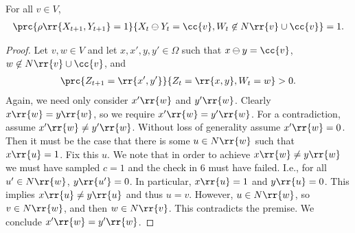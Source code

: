 \documentclass{article}
\begin{document}
\begin{claim*}[3b]
  For all $v\in V$,
  \begin{align*}
    \prc{\rho\rr{X_{t+1},Y_{t+1}}=1}{X_t\ominus Y_t=\cc{v},W_t\not\in N\rr{v}\cup\cc{v}}=1.
  \end{align*}
  \begin{proof}
    Let $v,w\in V$ and let $x,x',y,y'\in\Omega$ such that $x\ominus y=\cc{v}$, $w\not\in N\rr{v}\cup\cc{v}$, and
    \begin{align*}
      \prc{Z_{t+1}=\rr{x',y'}}{Z_t=\rr{x,y},W_t=w}>0.
    \end{align*}
    Again, we need only consider $x'\rr{w}$ and $y'\rr{w}$. Clearly $x\rr{w}=y\rr{w}$, so
    we require $x'\rr{w}=y'\rr{w}$. For a contradiction, assume $x'\rr{w}\neq y'\rr{w}$. Without loss of generality
    assume $x'\rr{w}=0$. Then it must be the case that there is some $u\in N\rr{w}$ such that
    $x\rr{u}=1$. Fix this $u$. We note that in order to achieve $x\rr{w}\neq y\rr{w}$ we must
    have sampled $c=1$ and the check in 6 must have failed. I.e., for all $u'\in N\rr{w}$,
    $y\rr{u'}=0$. In particular, $x\rr{u}=1$ and $y\rr{u}=0$. This implies $x\rr{u}\neq y\rr{u}$
    and thus $u=v$. However, $u\in N\rr{w}$, so $v\in N\rr{w}$, and then $w\in N\rr{v}$.
    This contradicts the premise. We conclude $x'\rr{w}=y'\rr{w}$.
  \end{proof}
\end{claim*}
\end{document}
